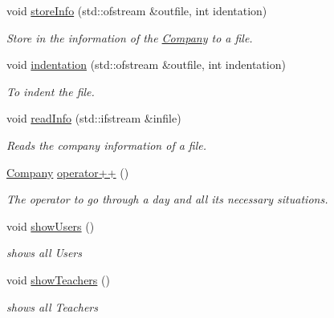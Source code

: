 \begin{DoxyCompactItemize}
void \mbox{\hyperlink{class_company_ac03f62f1accf21eb445a7aa5731b1199}{store\+Info}} (std\+::ofstream \&outfile, int identation)
\begin{DoxyCompactList}\small\item\em Store in the information of the \mbox{\hyperlink{class_company}{Company}} to a file. \end{DoxyCompactList}\item 
void \mbox{\hyperlink{class_company_aa8b5bbb3b2d49d13f36d4fcdfc0d20d1}{indentation}} (std\+::ofstream \&outfile, int indentation)
\begin{DoxyCompactList}\small\item\em To indent the file. \end{DoxyCompactList}\item 
void \mbox{\hyperlink{class_company_a2b97cd4ed80ecab0aa92d0f9c1f81071}{read\+Info}} (std\+::ifstream \&infile)
\begin{DoxyCompactList}\small\item\em Reads the company information of a file. \end{DoxyCompactList}\item 
\mbox{\hyperlink{class_company}{Company}} \mbox{\hyperlink{class_company_a80d971b44bc73adbb2bf3317f7747414}{operator++}} ()
\begin{DoxyCompactList}\small\item\em The operator to go through a day and all its necessary situations. \end{DoxyCompactList}\item 
\mbox{\label{class_company_a9446ed52b7e2831b24488072d1e54cde}} 
void \mbox{\hyperlink{class_company_a9446ed52b7e2831b24488072d1e54cde}{show\+Users}} ()
\begin{DoxyCompactList}\small\item\em shows all Users \end{DoxyCompactList}\item 
\mbox{\label{class_company_a81e7a22e6ea3e09b3865d44f3d9354f3}} 
void \mbox{\hyperlink{class_company_a81e7a22e6ea3e09b3865d44f3d9354f3}{show\+Teachers}} ()
\begin{DoxyCompactList}\small\item\em shows all Teachers \end{DoxyCompactList}\item 
\mbox{\label{class_company_a1779c78bdc9a4416a482be25b71efcd0}} 

\end{DoxyCompactItemize}

